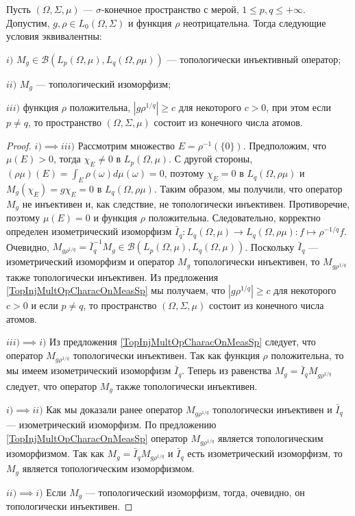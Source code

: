 \begin{proposition}\label{TopInjMultOpCharacBtwnTwoContMeasSp} Пусть $(\Omega,\Sigma,\mu)$ --- $\sigma$-конечное пространство с мерой, $1\leq p,q\leq+\infty$. Допустим, $g,\rho\in L_0(\Omega,\Sigma)$ и функция $\rho$ неотрицательна. Тогда следующие условия эквивалентны:

$i)$ $M_g\in\mathcal{B}(L_p(\Omega,\mu),L_q(\Omega,\rho\mu))$ --- топологически инъективный оператор;

$ii)$ $M_g$ --- топологический изоморфизм;

$iii)$ функция $\rho$ положительна, $|g \rho^{1/q}|\geq c$ для некоторого $c>0$, при этом если $p\neq q$, то пространство $(\Omega,\Sigma,\mu)$ состоит из конечного числа атомов.
\end{proposition}
\begin{proof} $i)$$\implies$$ iii)$ Рассмотрим множество $E=\rho^{-1}(\{0\})$. Предположим, что $\mu(E)>0$, тогда $\chi_E\neq 0$ в $L_p(\Omega,\mu)$. С другой стороны, $(\rho\mu)(E)=\int_E\rho(\omega)d\mu(\omega)=0$, поэтому $\chi_E=0$ в $L_q(\Omega,\rho\mu)$ и $M_g(\chi_E)=g\chi_E=0$ в $L_q(\Omega,\rho \mu)$. Таким образом, мы получили, что оператор $M_g$ не инъективен и, как следствие, не топологически инъективен. Противоречие, поэтому $\mu(E)=0$ и функция $\rho$ положительна. Следовательно, корректно определен изометрический изоморфизм $\bar{I}_q:L_q(\Omega,\mu)\to L_q(\Omega,\rho\mu):f\mapsto \rho^{-1/q} f$. Очевидно, $M_{g\rho^{1/q}}=\bar{I}_q^{-1} M_g\in\mathcal{B}(L_p(\Omega,\mu),L_q(\Omega,\mu))$. Поскольку $\bar{I}_q$ --- изометрический изоморфизм и оператор $M_g$ топологически инъективен, то $M_{g \rho^{1/q}}$ также топологически инъективен. Из предложения \ref{TopInjMultOpCharacOnMeasSp} мы получаем, что $|g\rho^{1/q}|\geq c$ для некоторого $c>0$ и если $p\neq q$, то пространство $(\Omega,\Sigma,\mu)$ состоит из конечного числа атомов.

$iii)$$\implies$$ i)$ Из предложения \ref{TopInjMultOpCharacOnMeasSp} следует, что оператор $M_{g \rho^{1/q}}$ топологически инъективен. Так как функция $\rho$ положительна, то мы имеем изометрический изоморфизм $\bar{I}_q$. Теперь из равенства $M_g=\bar{I}_q M_{g \rho^{1/q}}$ следует, что оператор $M_g$ также топологически инъективен.

$i)$$\implies$$ ii)$ Как мы доказали ранее оператор $M_{g \rho^{1/q}}$ топологически инъективен и $\bar{I}_q$ --- изометрический изоморфизм. По предложению \ref{TopInjMultOpCharacOnMeasSp} оператор $M_{g \rho^{1/q}}$ является топологическим изоморфизмом. Так как $M_g=\bar{I}_q M_{g \rho^{1/q}}$ и $\bar{I}_q$ есть изометрический изоморфизм, то $M_g$  является топологическим изоморфизмом.

$ii)$$\implies$$ i)$ Если $M_g$ --- топологический изоморфизм, тогда, очевидно, он топологически инъективен.
\end{proof}
